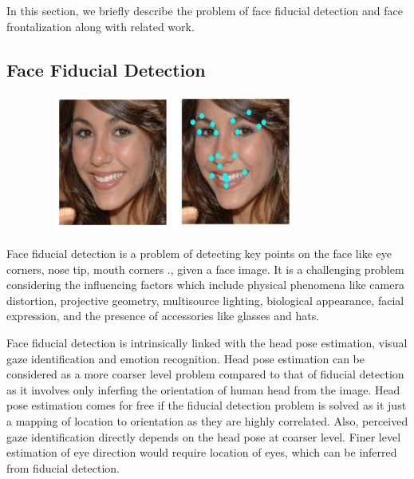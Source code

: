 In this section, we briefly describe the problem of face fiducial detection and face
frontalization along with related work.

\subsection{Face Fiducial Detection}

\begin{figure}[!ht]
  \centering
  \includegraphics[width=9cm,height=4.5cm]{intro/figures/face_fid.png}
  \caption{}
  \label{fig:intro_face_fid}
\end{figure}

% 

Face fiducial detection is a problem of detecting key points on the face like 
eye corners, nose tip, mouth corners \etc., given a face image. It is a challenging
problem considering the influencing factors which include physical phenomena like camera distortion, projective
geometry, multisource lighting, biological appearance, facial expression, and the presence of
accessories like glasses and hats. 

Face fiducial detection is intrinsically linked with the head pose estimation, visual
gaze identification and emotion recognition. Head pose estimation 
can be considered as a more coarser level problem compared to that of fiducial detection
as it involves only inferfing the orientation of human head from the image. Head pose 
estimation comes for free if the fiducial detection problem is solved as it just a mapping
of location to orientation as they are highly correlated. Also, perceived gaze identification 
directly depends on the head pose at coarser level. Finer level estimation of eye direction
would require location of eyes, which can be inferred from fiducial detection.

